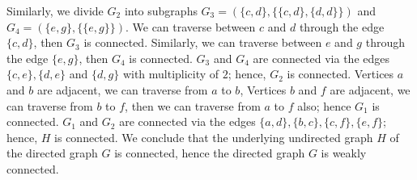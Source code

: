 \documentclass[11pt]{article}
\newcommand{\scale}[0] {2}
\begin{document}
\begin{figure}[H]
\end{figure}
Similarly, we divide $G_2$ into subgraphs $G_3=(\{c,d\},\{\{c,d\},\{d,d\}\})$ and $G_4=(\{e,g\},\{\{e,g\}\})$.
We can traverse between $c$ and $d$ through the edge $\{c,d\}$, then $G_3$ is connected. Similarly, 
we can traverse between $e$ and $g$ through the edge $\{e,g\}$, then $G_4$ is connected. $G_3$ and
$G_4$ are connected via the edges $\{c,e\},\{d,e\}$ and $\{d,g\}$ with multiplicity of $2$; hence, $G_2$ is connected. 
Vertices $a$ and $b$ are adjacent, we can traverse from $a$ to $b$, Vertices $b$ and $f$ are adjacent, we can traverse 
from $b$ to $f$, then we can traverse from $a$ to $f$ also; hence $G_1$ is connected. $G_1$ and
$G_2$ are connected via the edges $\{a,d\},\{b,c\},\{c,f\},\{e,f\}$; hence, $H$ is connected. We conclude that
the underlying undirected graph $H$ of the directed graph $G$ is connected, hence the directed graph $G$ is weakly connected.
\end{document}
